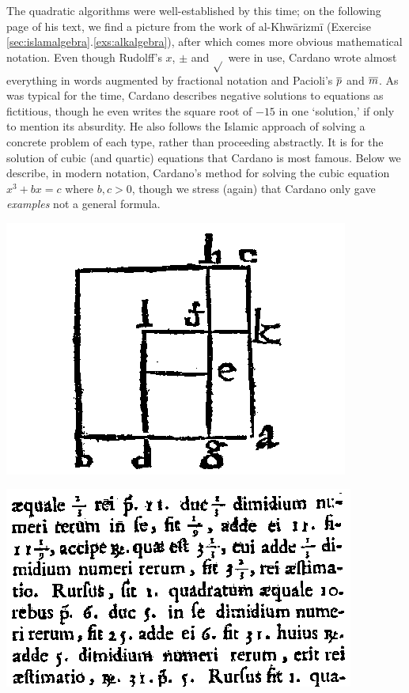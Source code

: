 \begin{minipage}[t]{0.65\linewidth}\vspace{0pt}
The quadratic algorithms were well-established by this time; on the following page of his text, we find a picture from the work of al-Khwārizmī (Exercise \ref*{sec:islamalgebra}.\ref{exs:alkalgebra}), after which comes more obvious mathematical notation. Even though Rudolff's $x$, $\pm$ and $\sqrt{}$ were in use, Cardano wrote almost everything in words augmented by fractional notation and Pacioli's $\overline{p}$ and $\overline{m}$.\smallbreak
As was typical for the time, Cardano describes negative solutions to equations as fictitious, though he even writes the square root of $-15$ in one `solution,' if only to mention its absurdity. He also follows the Islamic approach of solving a concrete problem of each type, rather than proceeding abstractly.\medbreak
It is for the solution of cubic (and quartic) equations that Cardano is most famous. Below we describe, in modern notation, Cardano's method for solving the cubic equation $x^3+bx=c$ where $b,c>0$, though we stress (again) that Cardano only gave \emph{examples} not a general formula.
\end{minipage}\hfill\begin{minipage}[t]{0.32\linewidth}\vspace{-5pt}
\flushright\includegraphics[width=\linewidth]{cardano3}\par
\includegraphics[width=\linewidth]{cardano2}
\end{minipage}\par


